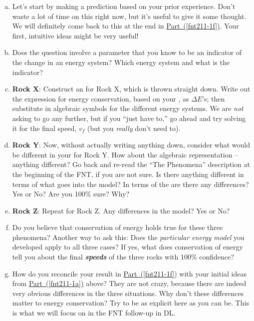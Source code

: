 \begin{enumerate}[(a)]
	\item Let's start by making a prediction based on your prior experience. Don't waste a lot of time on this right now, but it's useful to give it some thought. We will definitely come back to this at the end in \hyperref[fnt211-1f]{Part~(\ref*{fnt211-1f})}. Your first, intuitive ideas might be very useful!
	\label{fnt211-1a}
	
	\item Does the question involve a parameter that you know to be an indicator of the change in an energy system? Which energy system and what is the indicator?
	\label{fnt211-1b}
	
	\item \textbf{Rock X}: Construct an \EnergyDiagram{} for Rock X, which is thrown straight down. Write out the expression for energy conservation, based on your \EnergyDiagram{}, as $\Delta E$'s; then substitute in algebraic symbols for the different energy systems. We are \emph{not} asking to go any further, but if you ``just have to,'' go ahead and try solving it for the final speed, $v_f$ (but you \emph{really} don't need to).
	\label{fnt211-1c}
	
	\item \textbf{Rock Y}: Now, without actually writing anything down, consider what would be different in your \EnergyDiagram{} for Rock Y. How about the algebraic representation -- anything different?  Go back and re-read the ``The Phenomena'' description at the beginning of the FNT, if you are not sure. Is there anything different in terms of what goes into the model? In terms of the \EnergyInteractionModel{} are there any differences?  Yes or No? Are you 100\% sure? Why?
	\label{fnt211-1d}
	
	\item \textbf{Rock Z}: Repeat for Rock Z. Any differences in the model?  Yes or No?
	\label{fnt211-1e}
	
	\item Do you believe that conservation of energy holds true for these three phenomena? Another way to ask this: Does the {\em particular energy model} you developed apply to all three cases?  If yes, what does conservation of energy tell you about the final \textbf{\em speeds} of the three rocks with 100\% confidence?
	\label{fnt211-1f}
	
	\item How do you reconcile your result in \hyperref[fnt211-1f]{Part~(\ref*{fnt211-1f})} with your initial ideas from \hyperref[fnt211-1a]{Part~(\ref*{fnt211-1a})} above?  They are not crazy, because there are indeed very obvious differences in the three situations. Why don't these differences matter to energy conservation?  Try to be as explicit here as you can be. This is what we will focus on in the FNT follow-up in DL.
	\label{fnt211-1g}
\end{enumerate}